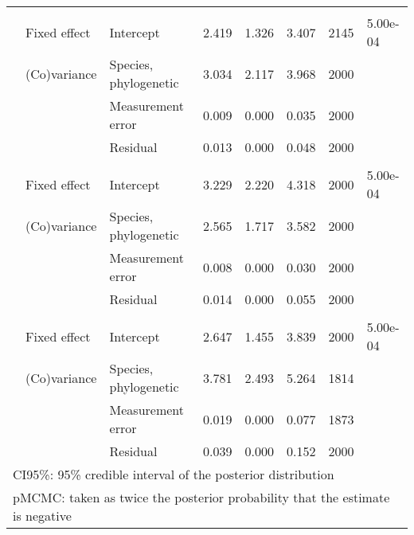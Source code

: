 \begin{table}
\begin{tabular}[t]{llllllll}
\addlinespace[0.3em]
\multicolumn{8}{l}{\textbf{Antibiotic degradation}}\\
\hspace{1em} & Fixed effect & Intercept & 2.419 & 1.326 & 3.407 & 2145 & 5.00e-04\\
\hspace{1em} & (Co)variance & Species, phylogenetic & 3.034 & 2.117 & 3.968 & 2000 & \\
\hspace{1em} &  & Measurement error & 0.009 & 0.000 & 0.035 & 2000 & \\
\hspace{1em} &  & Residual & 0.013 & 0.000 & 0.048 & 2000 & \\
\addlinespace[0.3em]
\multicolumn{8}{l}{\textbf{Quorum sensing}}\\
\hspace{1em} & Fixed effect & Intercept & 3.229 & 2.220 & 4.318 & 2000 & 5.00e-04\\
\hspace{1em} & (Co)variance & Species, phylogenetic & 2.565 & 1.717 & 3.582 & 2000 & \\
\hspace{1em} &  & Measurement error & 0.008 & 0.000 & 0.030 & 2000 & \\
\hspace{1em} &  & Residual & 0.014 & 0.000 & 0.055 & 2000 & \\
\addlinespace[0.3em]
\multicolumn{8}{l}{\textbf{Secretion systems}}\\
\hspace{1em} & Fixed effect & Intercept & 2.647 & 1.455 & 3.839 & 2000 & 5.00e-04\\
\hspace{1em} & (Co)variance & Species, phylogenetic & 3.781 & 2.493 & 5.264 & 1814 & \\
\hspace{1em} &  & Measurement error & 0.019 & 0.000 & 0.077 & 1873 & \\
\hspace{1em} &  & Residual & 0.039 & 0.000 & 0.152 & 2000 & \\
\bottomrule
\multicolumn{8}{l}{\rule{0pt}{1em}CI95\%: 95\% credible interval of the posterior distribution}\\
\multicolumn{8}{l}{\rule{0pt}{1em}pMCMC: taken as twice the posterior probability that the estimate is negative}\\
\end{tabular}
\end{table}
